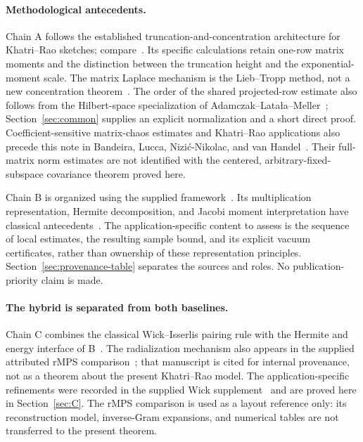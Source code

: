 \documentclass[11pt]{article}
\numberwithin{equation}{section}
\theoremstyle{definition}\newtheorem{definition}[theorem]{Definition}
\theoremstyle{remark}\newtheorem{remark}[theorem]{Remark}
\begin{document}
\paragraph{Methodological antecedents.}
Chain A follows the established truncation-and-concentration architecture for
Khatri--Rao sketches; compare~\cite[Section~2.3]{BM}. Its specific calculations
retain one-row matrix moments and the distinction between the truncation height
and the exponential-moment scale. The matrix Laplace mechanism is the
Lieb--Tropp method, not a new concentration theorem~\cite{Lieb,Tropp}.
The order of the shared projected-row estimate also follows from the Hilbert-space
specialization of Adamczak--Lata\l a--Meller~\cite[Corollary~12]{ALM};
Section~\ref{sec:common} supplies an explicit normalization and a short direct proof.
Coefficient-sensitive matrix-chaos estimates and Khatri--Rao applications also
precede this note in Bandeira, Lucca, Nizi\'c-Nikolac, and
van Handel~\cite{BLNvH}. Their full-matrix norm estimates are not identified with
the centered, arbitrary-fixed-subspace covariance theorem proved here.

Chain B is organized using the supplied framework~\cite{Framework}. Its
multiplication representation, Hermite decomposition, and Jacobi moment
interpretation have classical antecedents~\cite{Wiener,AccardiBozejko,GolubWelsch}.
The application-specific content to assess is the sequence of local estimates,
the resulting sample bound, and its explicit vacuum certificates, rather than
ownership of these representation principles. Section~\ref{sec:provenance-table}
separates the sources and roles. No publication-priority claim is made.

\paragraph{The hybrid is separated from both baselines.}
Chain C combines the classical Wick--Isserlis pairing rule with the Hermite
and energy interface of B~\cite{Isserlis,Janson,Framework}. The radialization
mechanism also appears in the supplied attributed rMPS comparison~\cite{RMPS};
that manuscript is cited for internal provenance, not as a theorem about the
present Khatri--Rao model. The application-specific refinements were recorded
in the supplied Wick supplement~\cite{WickNote} and are proved here in
Section~\ref{sec:C}. The rMPS comparison is used as a layout reference only:
its reconstruction model, inverse-Gram expansions, and numerical tables are not
transferred to the present theorem.
\clearpage
\end{document}
